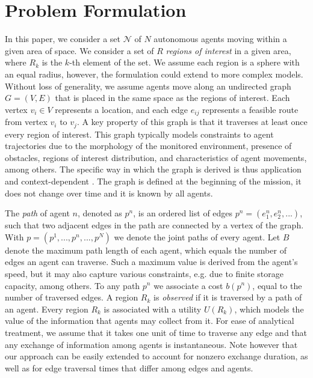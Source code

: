 \section{Problem Formulation}
\label{sec:problem_formulation}

In this paper, we consider a set $\mathcal{N}$ of $N$ autonomous agents moving within a given area of space. We consider a set of $R$ \textit{regions of interest} in a given area, where $R_k$ is the $k$-th element of the set. We assume each region is a sphere with an equal radius, however, the formulation could extend to more complex models.
Without loss of generality, we assume agents move along an undirected graph $G = (V, E)$ that is placed in the same space as the regions of interest. Each vertex $v_i \in V$ represents a location, and each edge $e_{ij}$ represents a feasible route from vertex $v_i$ to $v_j$. A key property of this graph is that it traverses at least once every region of interest.
This graph typically models constraints to agent trajectories due to the morphology of the monitored environment, presence of obstacles, regions of interest distribution, and characteristics of agent movements, among others. The specific way in which the graph is derived is thus application and context-dependent  \citep{nguyen2022multi}. The graph is defined at the beginning of the mission, it does not change over time and it is known by all agents.

The \emph{path} of agent $n$, denoted as $p^n$, is an ordered list of edges $p^n = (e^n_1, e^n_2,...)$, such that two adjacent edges in the path are connected by a vertex of the graph. With $p = (p^1, ..., p^n, ..., p^N)$ we denote the joint paths of every agent. Let $B$ denote the maximum path length of each agent, which equals the number of edges an agent can traverse. Such a maximum value is derived from the agent's speed, but it may also capture various constraints, e.g. due to finite storage capacity, among others. To any path $p^n$ we associate a cost $b(p^n)$, equal to the number of traversed edges. A region $R_k$ is \textit{observed} if it is traversed by a path of an agent. Every region $R_k$ is associated with a utility $U(R_k)$, which models the value of the information that agents may collect from it. For ease of analytical treatment, we assume that it takes one unit of time to traverse any edge and that any exchange of information among agents is instantaneous. Note however that our approach can be easily extended to account for nonzero exchange duration, as well as for edge traversal times that differ among edges and agents.

